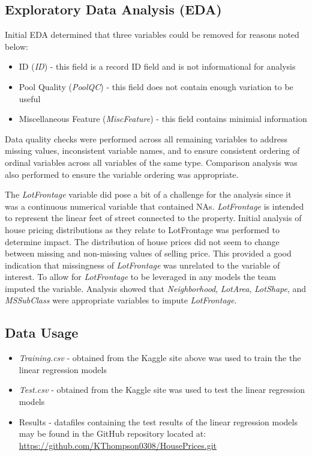 \documentclass[american,]{article}
\providecommand{\tightlist}{%
  \setlength{\itemsep}{0pt}\setlength{\parskip}{0pt}}
\begin{document}
\subsection{Exploratory Data Analysis
(EDA)}\label{exploratory-data-analysis-eda}

Initial EDA determined that three variables could be removed for reasons
noted below:

\begin{itemize}
\tightlist
\item
  ID (\emph{ID}) - this field is a record ID field and is not
  informational for analysis
\item
  Pool Quality (\emph{PoolQC}) - this field does not contain enough
  variation to be useful
\item
  Miscellaneous Feature (\emph{MiscFeature}) - this field contains
  minimial information
\end{itemize}

Data quality checks were performed across all remaining variables to
address missing values, inconsistent variable names, and to ensure
consistent ordering of ordinal variables across all variables of the
same type. Comparison analysis was also performed to ensure the variable
ordering was appropriate.

The \emph{LotFrontage} variable did pose a bit of a challenge for the
analysis since it was a continuous numerical variable that contained
NAs. \emph{LotFrontage} is intended to represent the linear feet of
street connected to the property. Initial analysis of house pricing
distributions as they relate to LotFrontage was performed to determine
impact. The distribution of house prices did not seem to change between
missing and non-missing values of selling price. This provided a good
indication that missingness of \emph{LotFrontage} was unrelated to the
variable of interest. To allow for \emph{LotFrontage} to be leveraged in
any models the team imputed the variable. Analysis showed that
\emph{Neighborhood}, \emph{LotArea}, \emph{LotShape}, and
\emph{MSSubClass} were appropriate variables to impute
\emph{LotFrontage}.

\subsection{Data Usage}\label{data-usage}

\begin{itemize}
\item
  \emph{Training.csv} - obtained from the Kaggle site above was used to
  train the the linear regression models
\item
  \emph{Test.csv} - obtained from the Kaggle site was used to test the
  linear regression models
\item
  Results - datafiles containing the test results of the linear
  regression models may be found in the GitHub repository located at:
  \url{https://github.com/KThompson0308/HousePrices.git}
\end{itemize}
\end{document}
